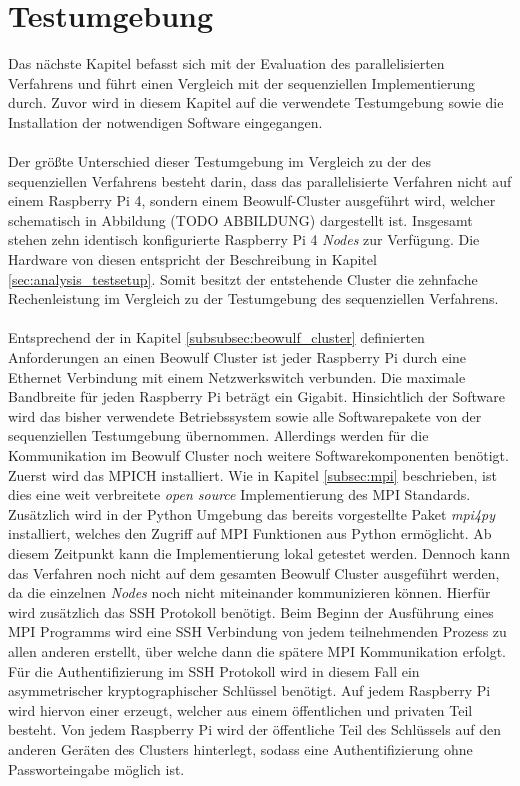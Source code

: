 \section{Testumgebung} %
Das nächste Kapitel befasst sich mit der Evaluation des parallelisierten Verfahrens und führt einen Vergleich mit der sequenziellen Implementierung durch. Zuvor wird in diesem Kapitel auf die verwendete Testumgebung sowie die Installation der notwendigen Software eingegangen. 
\\\\
Der größte Unterschied dieser Testumgebung im Vergleich zu der des sequenziellen Verfahrens besteht darin, dass das parallelisierte Verfahren nicht auf einem Raspberry Pi 4, sondern einem Beowulf-Cluster ausgeführt wird, welcher schematisch in Abbildung (TODO ABBILDUNG) dargestellt ist. Insgesamt stehen zehn identisch konfigurierte Raspberry Pi 4 \emph{Nodes} zur Verfügung. Die Hardware von diesen entspricht der Beschreibung in Kapitel \ref{sec:analysis_testsetup}. Somit besitzt der entstehende Cluster die zehnfache Rechenleistung im Vergleich zu der Testumgebung des sequenziellen Verfahrens.
\\\\
Entsprechend  der in Kapitel \ref{subsubsec:beowulf_cluster} definierten Anforderungen an einen Beowulf Cluster ist jeder Raspberry Pi durch eine Ethernet Verbindung mit einem Netzwerkswitch verbunden. Die maximale Bandbreite für jeden Raspberry Pi beträgt ein Gigabit. Hinsichtlich der Software wird das bisher verwendete Betriebssystem sowie alle Softwarepakete von der sequenziellen Testumgebung übernommen. Allerdings werden für die Kommunikation im Beowulf Cluster noch weitere Softwarekomponenten benötigt. Zuerst wird das MPICH installiert. Wie in Kapitel \ref{subsec:mpi} beschrieben, ist dies eine weit verbreitete \emph{open source} Implementierung des \ac{MPI} Standards. Zusätzlich wird in der Python Umgebung das bereits vorgestellte Paket \emph{mpi4py} installiert, welches den Zugriff auf \ac{MPI} Funktionen aus Python ermöglicht. Ab diesem Zeitpunkt kann die Implementierung lokal getestet werden. Dennoch kann das Verfahren noch nicht auf dem gesamten Beowulf Cluster ausgeführt werden, da die einzelnen \emph{Nodes} noch nicht miteinander kommunizieren können. Hierfür wird zusätzlich das \ac{SSH} Protokoll benötigt. Beim Beginn der Ausführung eines \ac{MPI} Programms wird eine \ac{SSH} Verbindung von jedem teilnehmenden Prozess zu allen anderen erstellt, über welche dann die spätere \ac{MPI} Kommunikation erfolgt. Für die Authentifizierung im \ac{SSH} Protokoll wird in diesem Fall ein asymmetrischer kryptographischer Schlüssel benötigt. Auf jedem Raspberry Pi wird hiervon einer erzeugt, welcher aus einem öffentlichen und privaten Teil besteht. Von jedem Raspberry Pi wird der öffentliche Teil des Schlüssels auf den anderen Geräten des Clusters hinterlegt, sodass eine Authentifizierung ohne Passworteingabe möglich ist.
